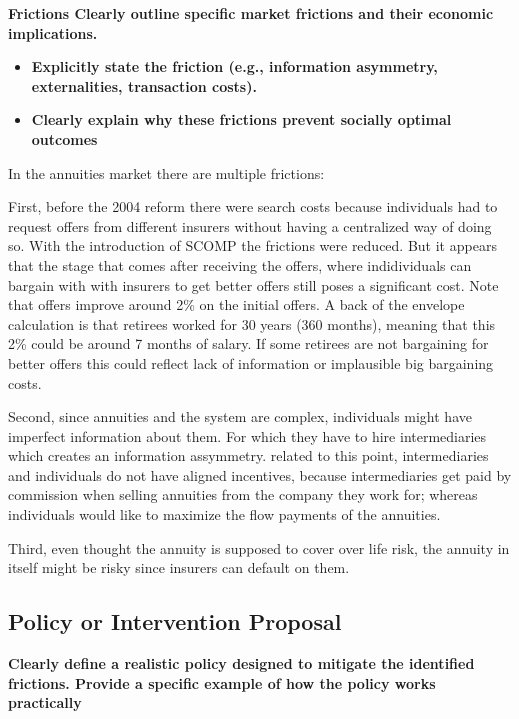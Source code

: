 \documentclass[12pt]{article}
\theoremstyle{plain}
\theoremstyle{plain}
\begin{document}
 
 \textbf{Frictions Clearly outline specific market frictions and their economic implications.}

\begin{itemize}
    \item \textbf{Explicitly state the friction (e.g., information asymmetry, externalities, transaction costs).}

    \item \textbf{Clearly explain why these frictions prevent socially optimal outcomes}
\end{itemize}

In the annuities market there are multiple frictions: 

First, before the 2004 reform there were search costs because individuals had to request offers from different insurers without having a centralized way of doing so. With the introduction of SCOMP the frictions were reduced. But it appears that the stage that comes after receiving the offers, where indidividuals can bargain with with insurers to get better offers still poses a significant cost. Note that offers improve around 2\% on the initial offers. A back of the envelope calculation is that retirees worked for 30 years (360 months), meaning that this 2\% could be around 7 months of salary. If some retirees are not bargaining for better offers this could reflect lack of information or implausible big bargaining costs. 


Second, since annuities and the system are complex, individuals might have imperfect information about them. For which they have to hire intermediaries which creates an information assymmetry. related to this point, intermediaries and individuals do not have aligned incentives, because intermediaries get paid by commission when selling annuities from the company they work for; whereas individuals would like to maximize the flow payments of the annuities. 

Third, even thought the annuity is supposed to cover over life risk, the annuity in itself might be risky since insurers can default on them.   

\subsection{ Policy or Intervention Proposal}

\textbf{Clearly define a realistic policy designed to mitigate the identified frictions. Provide a specific example of how the policy works practically}
\end{document}
